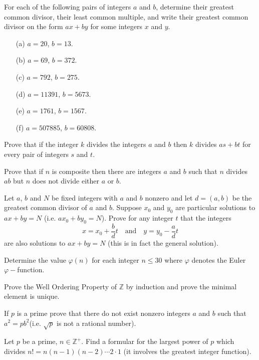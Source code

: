 \documentclass[cn,11pt,chinese]{elegantbook}
\numberwithin{equation}{section}
\begin{document}
\begin{problemset}
\item For each of the following pairs of integers $a$ and $b$, determine their greatest common divisor, their least common multiple, and write their greatest common divisor on the form $ax + by$ for some integers $x$ and $y$.
\begin{enumerate}
\item[(a)] $a = 20$, $b = 13$.
\item[(b)] $a = 69$, $b = 372$.
\item[(c)] $a = 792$, $b = 275$.
\item[(d)] $a = 11391$, $b = 5673$.
\item[(e)] $a = 1761$, $b = 1567$.
\item[(f)] $a = 507885$, $b = 60808$.
\end{enumerate}

\item Prove that if the integer $k$ divides the integers $a$ and $b$ then $k$ divides $as + bt$ for every pair of integers $s$ and $t$.

\item Prove that if $n$ is composite then there are integers $a$ and $b$ such that $n$ divides $ab$ but $n$ does not divide either $a$ or $b$.

\item Let $a$, $b$ and $N$ be fixed integers with $a$ and $b$ nonzero and let $d = (a, b)$ be the greatest common divisor of $a$ and $b$. Suppose $x_0$ and $y_0$ are particular solutions to $ax + by = N$ (i.e. $ax_0 + by_0 = N$). Prove for any integer $t$ that the integers
\[
x = x_0 + \frac{b}{d}t \quad\text{and}\quad y = y_0 - \frac{a}{d}t
\]
are also solutions to $ax + by = N$ (this is in fact the general solution).

\item Determine the value $\varphi(n)$ for each integer $n \le 30$ where $\varphi$ denotes the Euler $\varphi-$function.

\item Prove the Well Ordering Property of $\mathbb{Z}$ by induction and prove the minimal element is unique.

\item If $p$ is a prime prove that there do not exist nonzero integers $a$ and $b$ such that $a^2 = pb^2$(i.e. $\sqrt{p}$ is not a rational number).

\item Let $p$ be a prime, $n \in \mathbb{Z}^+$. Find a formular for the largest power of $p$ which divides $n!=n(n-1)(n-2)\cdots{}2\cdot{}1$ (it involves the greatest integer function).


\end{problemset}
\end{document}
